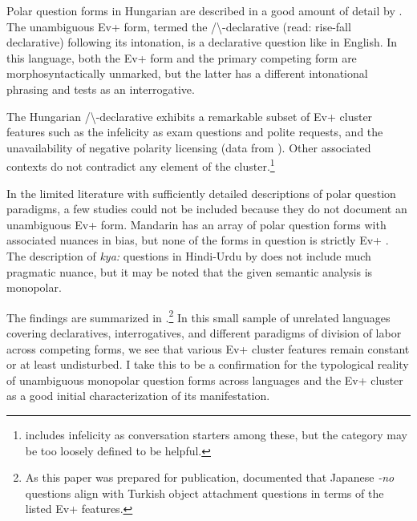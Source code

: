 \documentclass[output=paper,colorlinks,citecolor=brown]{langscibook}
\begin{document}
Polar question forms in Hungarian are described in a good amount of detail by \citet{gyuris-bias}. The unambiguous Ev+ form, termed the  /\textbackslash-declarative (read: rise-fall declarative) following its intonation,  is a declarative question like in English.  In this language, both the Ev+ form and the primary competing form are morphosyntactically unmarked, but the latter has a different intonational phrasing and tests as an interrogative. 

The Hungarian /\textbackslash-declarative exhibits a remarkable subset of Ev+ cluster features such as the infelicity as exam questions and polite requests, and the unavailability of negative polarity licensing  (data from \citealt{gyuris-bias}). Other associated contexts do not contradict any element of the cluster.\footnote{\citet{gyuris-bias} includes infelicity as conversation starters among these, but the category may be too loosely defined to be helpful.}   

\ea\label{jamboxes}
\z
\z

In the limited literature with sufficiently detailed descriptions of polar question paradigms, a few studies could not be included because they do not document an unambiguous Ev+ form. Mandarin has an array of polar question forms with associated nuances in bias, but none of the forms in question is strictly Ev+  \citep{ye21, yuan-hara-bias}. The description of \textit{kya:} questions in Hindi-Urdu by \citet{bhatt-dayal} does not include much pragmatic nuance, but it may be noted that the given semantic analysis is monopolar. 


The findings are summarized in .\footnote{As this paper was prepared for publication, \citet{kn-talk} documented that Japanese \textit{-no} questions align with Turkish object attachment questions in terms of the listed Ev+ features.} In this small sample of unrelated languages covering declaratives, interrogatives, and different paradigms of division of labor across competing forms, we see that various Ev+ cluster features remain constant or at least undisturbed. I take this to be a confirmation for the typological reality of unambiguous monopolar question forms across languages and the Ev+ cluster as a good initial characterization of its manifestation. 
\end{document}
